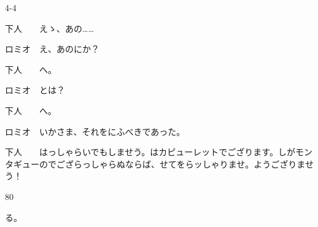 \documentclass[tate,paper=b6j,jafontsize=9pt]{jlreq}
\begin{document}
\begin{azconvIndented}{4\zw}{-4\zw}

下人　　えゝ、あの……

ロミオ　え、あのにか？

下人　　へ。

ロミオ　とは？

下人　　へ。

ロミオ　いかさま、それをにふべきであった。

下人　　はっしゃらいでもしませう。はカピューレットでござります。しがモンタギューのでござらっしゃらぬならば、せてをらッしゃりませ。ようござりませう！

\end{azconvIndented}
\begin{azconvIndented}{8\zw}{0\zw}

る。

\end{azconvIndented}
\end{document}
